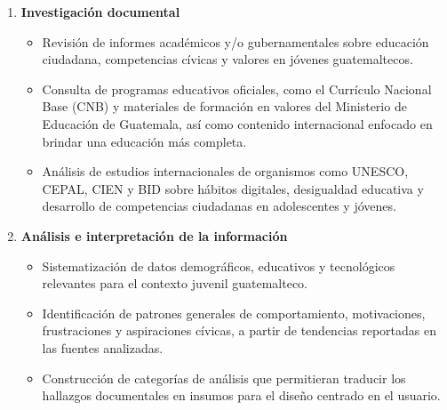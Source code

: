 \begin{enumerate}
      \item \textbf{Investigación documental}
            \begin{itemize}
                  \item Revisión de informes académicos y/o gubernamentales sobre educación ciudadana,
                        competencias cívicas y valores en jóvenes guatemaltecos.
                  \item Consulta de programas educativos oficiales, como el Currículo Nacional Base
                        (CNB) y materiales de formación en valores del Ministerio de Educación de
                        Guatemala, así como contenido internacional enfocado en brindar una educación
                        más completa.
                  \item Análisis de estudios internacionales de organismos como UNESCO, CEPAL, CIEN y
                        BID sobre hábitos digitales, desigualdad educativa y desarrollo de competencias
                        ciudadanas en adolescentes y jóvenes.
            \end{itemize}

      \item \textbf{Análisis e interpretación de la información}
            \begin{itemize}
                  \item Sistematización de datos demográficos, educativos y tecnológicos relevantes
                        para el contexto juvenil guatemalteco.
                  \item Identificación de patrones generales de comportamiento, motivaciones,
                        frustraciones y aspiraciones cívicas, a partir de tendencias reportadas en las
                        fuentes analizadas.
                  \item Construcción de categorías de análisis que permitieran traducir los hallazgos
                        documentales en insumos para el diseño centrado en el usuario.
            \end{itemize}


\end{enumerate}
